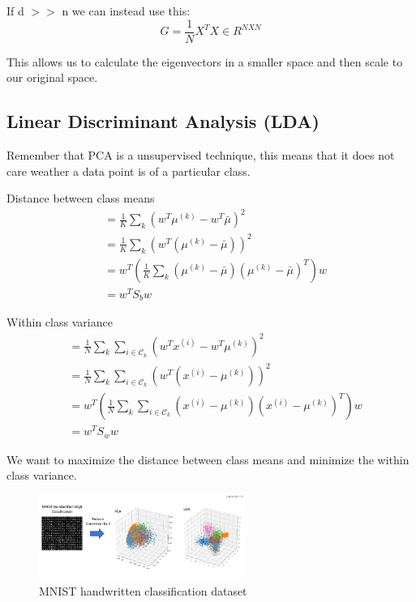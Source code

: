 \documentclass[11pt]{article}
\begin{document}
If d $>>$ n we can instead use this:
\[
G = \frac{1}{N}X^TX \in R^{NXN}
\]

This allows us to calculate the eigenvectors in a smaller space and then scale to our original space.

\subsection*{Linear Discriminant Analysis (LDA)}
Remember that PCA is a unsupervised technique, this means that it does not care weather a data point is of a particular class.

\medskip

Distance between class means 
\[
\begin{aligned}
&= \frac{1}{K} \sum_{k} \left( w^T \mu^{(k)} - w^T \bar{\mu} \right)^2 \\
&= \frac{1}{K} \sum_{k} \left( w^T (\mu^{(k)} - \bar{\mu}) \right)^2 \\
&= w^T \left( \frac{1}{K} \sum_{k} (\mu^{(k)} - \bar{\mu})(\mu^{(k)} - \bar{\mu})^T \right) w \\
&= w^T S_b w
\end{aligned}
\]

Within class variance
\[
\begin{aligned}
&= \frac{1}{N} \sum_{k} \sum_{i \in \mathcal{C}_k} \left( w^T x^{(i)} - w^T \mu^{(k)} \right)^2 \\
&= \frac{1}{N} \sum_{k} \sum_{i \in \mathcal{C}_k} \left( w^T (x^{(i)} - \mu^{(k)}) \right)^2 \\
&= w^T \left( \frac{1}{N} \sum_{k} \sum_{i \in \mathcal{C}_k} (x^{(i)} - \mu^{(k)})(x^{(i)} - \mu^{(k)})^T \right) w \\
&= w^T S_w w
\end{aligned}
\]

We want to maximize the distance between class means and minimize the within class variance.


\begin{figure}[h!]
	\centering
	\includegraphics[width=0.6\textwidth]{../imgs/pcavlda.png}
	\caption{MNIST handwritten classification dataset}
\end{figure}
\end{document}
